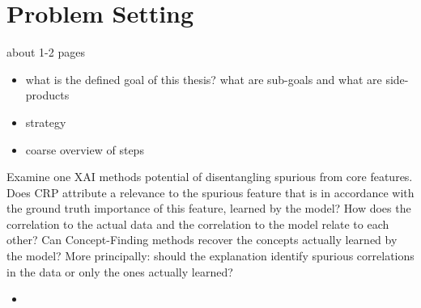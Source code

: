 \chapter{Problem Setting}\label{chapter:problem_setting}
{ \color{red}

about 1-2 pages

    \begin{itemize}
        \item what is the defined goal of this thesis? what are sub-goals and what are side-products
        \item strategy
        \item coarse overview of steps
    \end{itemize}
}

Examine one XAI methods potential of disentangling spurious from core features. 
Does CRP attribute a relevance to the spurious feature that is in accordance with the ground truth importance of this feature, learned by the model?
How does the correlation to the actual data and the correlation to the model relate to each other?
Can Concept-Finding methods recover the concepts actually learned by the model?
More principally: should the explanation identify spurious correlations in the data or only the ones actually learned? 


\begin{itemize}
    \item 
\end{itemize}